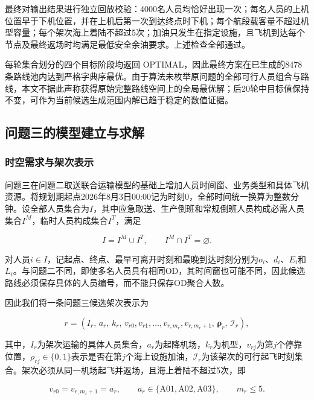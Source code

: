 \documentclass[UTF-8,a4paper,zihao=-4]{ctexart}
\begin{document}
最终对输出结果进行独立回放校验：4000名人员均恰好出现一次；每名人员的上机位置早于下机位置，并在上机后第一次到达终点时下机；每个航段载客量不超过机型容量；每个架次海上着陆不超过5次；加油只发生在指定设施，且飞机到达每个节点及最终返场时均满足最低安全余油要求。上述检查全部通过。

每轮集合划分的四个目标阶段均返回 OPTIMAL，因此最终方案在已生成的8478条路线池内达到严格字典序最优。由于算法未枚举原问题的全部可行人员组合与路线，本文不据此声称获得原始完整路线空间上的全局最优解；后20轮中目标值保持不变，可作为当前候选生成范围内解已趋于稳定的数值证据。


\subsection{问题三的模型建立与求解}
\subsubsection{时空需求与架次表示}

问题三在问题二取送联合运输模型的基础上增加人员时间窗、业务类型和具体飞机资源。将规划期起点2026年8月3日00:00记为时刻0，全部时间统一换算为整数分钟。设全部人员集合为$I$，其中应急取送、生产倒班和常规倒班人员构成必需人员集合$I^{M}$，临时人员构成集合$I^{T}$，满足

\begin{equation}
I=I^{M}\cup I^{T},
\qquad
I^{M}\cap I^{T}=\varnothing.
\end{equation}

对人员$i\in I$，记起点、终点、最早可离开时刻和最晚到达时刻分别为$o_i$、$d_i$、$E_i$和$L_i$。与问题二不同，即使多名人员具有相同OD，其时间窗也可能不同，因此候选路线必须保存具体的人员编号，而不能只保存OD聚合人数。

因此我们将一条问题三候选架次表示为

\begin{equation}
r=
\left(
I_r,\,
a_r,\,
k_r,\,
v_{r0},v_{r1},\ldots,v_{r,m_r},v_{r,m_r+1},\,
\boldsymbol{\rho}_r,\,
\mathcal{I}_r
\right),
\end{equation}

其中，$I_r$为架次运输的具体人员集合，$a_r$为起降机场，$k_r$为机型，$v_{rj}$为第$j$个停靠位置，$\rho_{rj}\in\{0,1\}$表示是否在第$j$个海上设施加油，$\mathcal{I}_r$为该架次的可行起飞时刻集合。架次必须从同一机场起飞并返场，且海上着陆不超过5次，即

\begin{equation}
v_{r0}=v_{r,m_r+1}=a_r,
\qquad
a_r\in\{\mathrm{A01},\mathrm{A02},\mathrm{A03}\},
\qquad
m_r\leq 5.
\end{equation}
\end{document}
